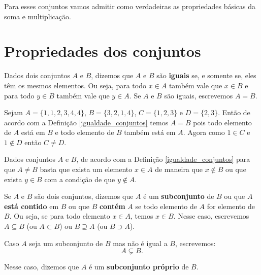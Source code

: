 \begin{observacao}
	Para esses conjuntos vamos admitir como verdadeiras as propriedades b\'asicas da soma e multiplica\c{c}\~ao.
\end{observacao}
\section{Propriedades dos conjuntos}

\begin{definicao}\label{igualdade_conjuntos}
	Dados dois conjuntos $A$ e $B$, dizemos que $A$ e $B$ s{\~a}o \textbf{iguais} se, e somente se, eles t{\^e}m os mesmos elementos. Ou seja, para todo $x \in A$ também vale que $x \in B$ e para todo $y \in B$ também vale que $y \in A$. Se $A$ e $B$ s{\~a}o iguais, escrevemos $A = B$.
\end{definicao}

\begin{exemplo}
	Sejam $A = \{1,1,2,3,4,4\}$, $B = \{3,2,1,4\}$, $C = \{1,2,3\}$ e $D = \{2,3\}$. Ent\~ao de acordo com a Defini\c{c}\~ao \ref{igualdade_conjuntos} temos $A = B$ pois todo elemento de $A$ est\'a em $B$ e todo elemento de $B$ tamb\'em est\'a em $A$. Agora como $1 \in C$ e $1 \notin D$ ent\~ao $C \ne D$.
\end{exemplo}

\begin{observacao}
	Dados conjuntos $A$ e $B$, de acordo com a Defini\c{c}\~ao \ref{igualdade_conjuntos} para que $A \ne B$ basta que exista um elemento $x \in A$ de maneira que $x \notin B$ ou que exista $y \in B$ com a condição de que $y \notin A$.
\end{observacao}

\begin{definicao}\label{definicao_continencia_conjuntos}
	Se $A$ e $B$ s{\~a}o dois conjuntos, dizemos que $A$ {\'e} um \textbf{subconjunto} de $B$ ou que $A$ \textbf{est\'a contido} em $B$ ou que $B$ \textbf{cont\'em} $A$ se todo elemento de $A$ for elemento de $B$. Ou seja, se para todo elemento $x \in A$, temos $x \in B$. Nesse caso, escrevemos $A \subseteq B$ (ou $A \subset B$) ou $B \supseteq A$ (ou $B \supset A$).
\end{definicao}


Caso $A$ seja um subconjunto de $B$ mas n{\~a}o {\'e} igual a $B$, escrevemos:
\[
	A \subsetneq B.
\]

Nesse caso, dizemos que $A$ {\'e} um \textbf{subconjunto pr{\'o}prio} de $B$.


